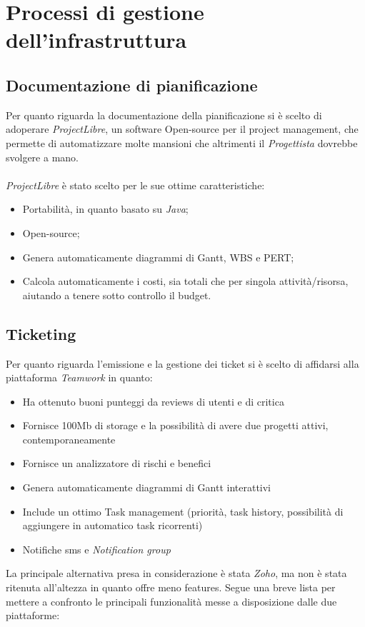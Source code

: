 \documentclass[a4paper]{report}
\begin{document}
	\section{Processi di gestione dell'infrastruttura}
	\subsection{Documentazione di pianificazione}
		Per quanto riguarda la documentazione della pianificazione si è scelto di adoperare
		\emph{ProjectLibre}, un software Open-source per il project management, che permette
		di automatizzare molte mansioni che altrimenti il \emph{Progettista} dovrebbe svolgere
		a mano. \\ \\
		\emph{ProjectLibre} è stato scelto per le sue ottime caratteristiche:
		\begin{itemize}
			\item Portabilità, in quanto basato su \emph{Java};
			\item Open-source;
			\item Genera automaticamente diagrammi di Gantt, WBS e PERT;
			\item Calcola automaticamente i costi, sia totali che per singola attività/risorsa, 
			aiutando a tenere sotto controllo il budget.
		\end{itemize}
	\subsection{Ticketing}	
	Per quanto riguarda l'emissione e la gestione dei ticket si è scelto di affidarsi alla piattaforma \emph{Teamwork}
	in quanto:
	\begin{itemize}
		\item Ha ottenuto buoni punteggi da reviews di utenti e di critica
		\item Fornisce 100Mb di storage e la possibilità di avere due progetti attivi, contemporaneamente
		\item Fornisce un analizzatore di rischi e benefici
		\item Genera automaticamente diagrammi di Gantt interattivi
		\item Include un ottimo Task management (priorità, task history, possibilità di aggiungere in automatico task ricorrenti)
		\item Notifiche sms e \emph{Notification group}
	\end{itemize}
	
	
	La principale alternativa presa in considerazione è stata \emph{Zoho}, ma non è stata ritenuta all'altezza in quanto offre 
	meno features. Segue una breve lista per mettere a confronto le principali funzionalità messe a disposizione dalle due piattaforme: \\
	
\end{document}
